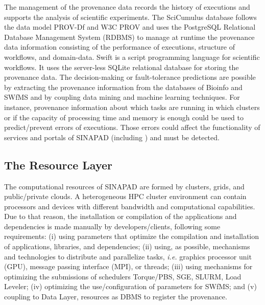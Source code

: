 The management of the provenance data \cite{e2df054d304d4601be3c733a9d73ff5d} records the history of executions and supports the analysis of scientific experiments. The SciCumulus database follows the data model PROV-Df and W3C PROV and uses the PostgreSQL Relational Database Management System (RDBMS) to manage at runtime the provenance data information consisting of the performance of executions, structure of workflows, and domain-data. Swift is a script programming language for scientific workflows. It uses the server-less SQLite relational database for storing the provenance data. 
The decision-making or fault-tolerance predictions are possible by extracting the provenance information from the databases of Bioinfo and SWfMS and by coupling data mining and machine learning techniques. For instance, provenance information about which tasks are running in which clusters or if the capacity of processing time and memory is enough could be used to predict/prevent errors of executions. Those errors could affect the functionality of services and portals of SINAPAD (including \system) and must be detected. 

\vspace{-5px}
\subsection{The Resource Layer}

The computational resources of SINAPAD are formed by clusters, grids, and public/private clouds. A heterogeneous HPC cluster environment can contain processors and devices with different bandwidth and computational capabilities. Due to that reason, the installation or compilation of the applications and dependencies is made manually by developers/clients, following some requirements: (i) using parameters that optimize the compilation and installation of applications, libraries, and dependencies; (ii) using, as possible, mechanisms and technologies to distribute and parallelize tasks, \textit{i.e.} graphics processor unit (GPU), message passing interface (MPI), or threads; (iii) using mechanisms for optimizing the submissions of schedulers Torque/PBS, SGE, SLURM, Load Leveler; (iv) optimizing the use/configuration of parameters for SWfMS; and (v) coupling to Data Layer, resources as DBMS to register the provenance.

